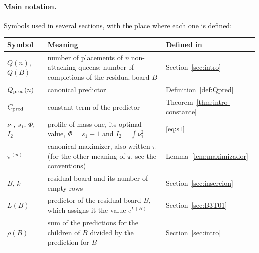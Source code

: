 \paragraph{Main notation.}
Symbols used in several sections, with the place where each one is defined:
\begin{center}
\small
\begin{tabular}{@{}l>{\raggedright\arraybackslash}p{}l@{}}
\toprule
Symbol & Meaning & Defined in\\
\midrule
$Q(n)$, $Q(B)$ & number of placements of $n$ non-attacking queens; number of completions of the
residual board $B$ & Section~\ref{sec:intro}\\
$Q_{\rm pred}(n)$ & canonical predictor & Definition~\ref{def:Qpred}\\
$C_{\rm pred}$ & constant term of the predictor & Theorem~\ref{thm:intro-constante}\\
$\nu_1$, $s_1$, $\Phi$, $I_2$ & profile of mass one, its optimal value, $\Phi=s_1+1$ and
$I_2=\int\nu_1^2$ & \eqref{eq:s1}\\
$\pi^{(n)}$ & canonical maximizer, also written $\pi$ (for the other meaning of $\pi$, see the
conventions) & Lemma~\ref{lem:maximizador}\\
$B$, $k$ & residual board and its number of empty rows & Section~\ref{sec:insercion}\\
$L(B)$ & predictor of the residual board $B$, which assigns it the value $e^{L(B)}$ &
Section~\ref{sec:B3T01}\\
$\rho(B)$ & sum of the predictions for the children of $B$ divided by the prediction for $B$ &
Section~\ref{sec:intro}\\
\bottomrule
\end{tabular}
\end{center}
